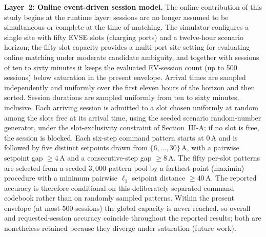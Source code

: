 \documentclass{ieeeaccess}
\begin{document}
    \textbf{Layer~2: Online event-driven session model.}
    The online contribution of this study begins at the runtime layer: sessions are no longer assumed to be simultaneous or complete at the time of matching.
    The simulator configures a single site with fifty EVSE slots (charging ports) and a twelve-hour scenario horizon; the fifty-slot capacity provides a multi-port site setting for evaluating online matching under moderate candidate ambiguity, and together with sessions of ten to sixty minutes it keeps the evaluated EV-session count (up to 500 sessions) below saturation in the present envelope.
    Arrival times are sampled independently and uniformly over the first eleven hours of the horizon and then sorted. Session durations are sampled uniformly from ten to sixty minutes, inclusive. Each arriving session is admitted to a slot chosen uniformly at random among the slots free at its arrival time, using the seeded scenario random-number generator, under the slot-exclusivity constraint of Section~III-A; if no slot is free, the session is blocked.
    Each six-step command pattern starts at $0$\,A and is followed by five distinct setpoints drawn from $\{6,\dots,30\}$\,A, with a pairwise setpoint gap $\geq 4$\,A and a consecutive-step gap $\geq 8$\,A. The fifty per-slot patterns are selected from a seeded $3{,}000$-pattern pool by a farthest-point (maximin) procedure with a minimum pairwise $\ell_1$ setpoint distance $\geq 40$\,A. The reported accuracy is therefore conditional on this deliberately separated command codebook rather than on randomly sampled patterns.
    Within the present envelope (at most 500 sessions) the global capacity is never reached, so overall and requested-session accuracy coincide throughout the reported results; both are nonetheless retained because they diverge under saturation (future work).
\end{document}
